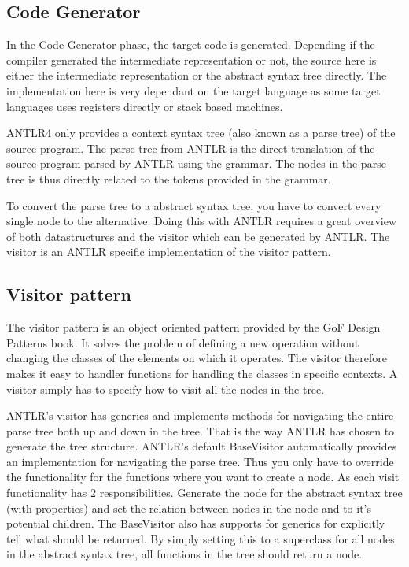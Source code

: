 \subsection{Code Generator}
In the Code Generator phase, the target code is generated. Depending if the compiler generated the intermediate representation or not, the source here is either the intermediate representation or the abstract syntax tree directly. The implementation here is very dependant on the target language as some target languages uses registers directly or stack based machines.

ANTLR4 only provides a context syntax tree (also known as a parse tree) of the source program. The parse tree from ANTLR is the direct translation of the source program parsed by ANTLR using the grammar. The nodes in the parse tree is thus directly related to the tokens provided in the grammar.

To convert the parse tree to a abstract syntax tree, you have to convert every single node to the alternative.
Doing this with ANTLR requires a great overview of both datastructures and the visitor which can be generated by ANTLR. The visitor is an ANTLR specific implementation of the visitor pattern.

\subsection{Visitor pattern}
The visitor pattern is an object oriented pattern provided by the GoF Design Patterns book.
It solves the problem of defining a new operation without changing the classes of the elements on which it operates.
The visitor therefore makes it easy to handler functions for handling the classes in specific contexts. A visitor simply has to specify how to visit all the nodes in the tree.

ANTLR's visitor has generics and implements methods for navigating the entire parse tree both up and down in the tree. That is the way ANTLR has chosen to generate the tree structure.
ANTLR's default BaseVisitor automatically provides an implementation for navigating the parse tree. Thus you only have to override the functionality for the functions where you want to create a node.
As each visit functionality has 2 responsibilities. Generate the node for the abstract syntax tree (with properties) and set the relation between nodes in the node and to it's potential children.
The BaseVisitor also has supports for generics for explicitly tell what should be returned. By simply setting this to a superclass for all nodes in the abstract syntax tree, all functions in the tree should return a node. 

